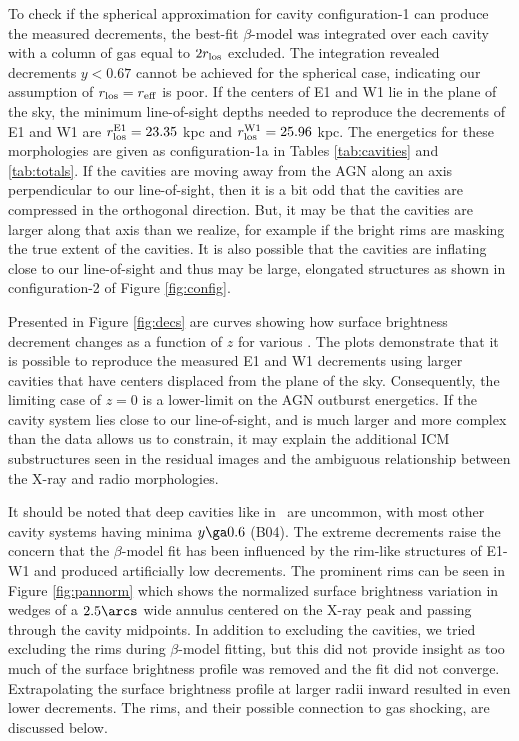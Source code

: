 \documentclass[11pt, preprint]{aastex}
\begin{document}
To check if the spherical approximation for cavity configuration-1 can
produce the measured decrements, the best-fit $\beta$-model was
integrated over each cavity with a column of gas equal to $2r_{\rm{los}}$
excluded. The integration revealed decrements $y < 0.67$ cannot be
achieved for the spherical case, indicating our assumption of $r_{\rm{los}} =
r_{\rm{eff}}$ is poor. If the centers of E1 and W1 lie in the plane of the
sky, the minimum line-of-sight depths needed to reproduce the
decrements of E1 and W1 are $r_{\rm{los}}^{\rm{E1}} = 23.35$ kpc and
$r_{\rm{los}}^{\rm{W1}} = 25.96$ kpc. The energetics for these morphologies
are given as configuration-1a in Tables \ref{tab:cavities} and
\ref{tab:totals}. If the cavities are moving away from the AGN along
an axis perpendicular to our line-of-sight, then it is a bit odd that
the cavities are compressed in the orthogonal direction. But, it may
be that the cavities are larger along that axis than we realize, for
example if the bright rims are masking the true extent of the
cavities. It is also possible that the cavities are inflating close to
our line-of-sight and thus may be large, elongated structures as shown
in configuration-2 of Figure \ref{fig:config}.

Presented in Figure \ref{fig:decs} are curves showing how surface
brightness decrement changes as a function of $z$ for various
\rlos. The plots demonstrate that it is possible to reproduce the
measured E1 and W1 decrements using larger cavities that have centers
displaced from the plane of the sky. Consequently, the limiting case
of $z = 0$ is a lower-limit on the AGN outburst energetics. If the
cavity system lies close to our line-of-sight, and is much larger and
more complex than the data allows us to constrain, it may explain the
additional ICM substructures seen in the residual images and the
ambiguous relationship between the X-ray and radio
morphologies.

It should be noted that deep cavities like in \rbs\ are uncommon, with
most other cavity systems having minima $y \ga 0.6$ (B04). The extreme
decrements raise the concern that the $\beta$-model fit has been
influenced by the rim-like structures of E1-W1 and produced
artificially low decrements. The prominent rims can be seen in Figure
\ref{fig:pannorm} which shows the normalized surface brightness
variation in wedges of a $2.5\arcs$ wide annulus centered on the X-ray
peak and passing through the cavity midpoints. In addition to
excluding the cavities, we tried excluding the rims during
$\beta$-model fitting, but this did not provide insight as too much of
the surface brightness profile was removed and the fit did not
converge. Extrapolating the surface brightness profile at larger radii
inward resulted in even lower decrements. The rims, and their possible
connection to gas shocking, are discussed below.
\end{document}
